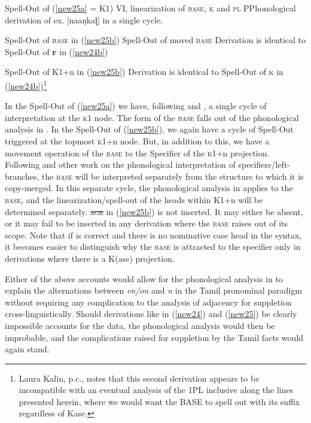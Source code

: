 \documentclass[output=paper]{langscibook}
\begin{document}
\begin{exe}
\ex
\begin{xlist}
\ex \label{new25c}
Spell-Out of (\ref{new25a} = K1)  \rightarrow 
\ea VI, linearization of \textsc{base}, \textsc{k} and \textsc{pl}
\ex PPhonological derivation of ex. [naaŋkaɭ]  in a single cycle.
\z



\ex \label{new25d} 
Spell-Out of \textsc{base} in (\ref{new25b}) \rightarrow 
\ea Spell-Out of moved \textsc{base} 	Derivation  is identical to Spell-Out 	of \textbf{\textsc{f}} in (\ref{new24b})
\z

Spell-Out of K1+n in (\ref{new25b})  \rightarrow 
\ea Derivation is identical to Spell-Out of  \textsc{k} in (\ref{new24b})\footnote{Laura Kalin, p.c., notes that this second derivation appears to be incompatible with an eventual analysis of the 1PL inclusive along the lines presented herein, where we would want the BASE to spell out with its suffix regardless of Kase.}\z
\end{xlist}
\end{exe}

In the Spell-Out of (\ref{new25a}) we have, following \citet{Moskal2015} and \citet{moskal2016towards}, a single cycle of interpretation at the \textsc{k}1 node. The form of the \textsc{base} falls out of the phonological analysis in . In the Spell-Out of (\ref{new25b}), we again have a cycle of Spell-Out triggered at the topmost \textsc{k}1+n node. But, in addition to this, we have a movement operation of the \textsc{base} to the Specifier of the \textsc{k}1+n projection. Following \citet{Johnson2004} and other work on the phonological interpretation of specifiers/left-branches, the \textsc{base} will be interpreted separately from the structure to which it is copy-merged. In this separate cycle, the phonological analysis in  applies to the \textsc{base}, and the linearization/spell-out of the heads within K1+n will be determined separately. \textsc{\sout{agr}} in (\ref{new25b}) is not inserted. It may either be absent, or it may fail to be inserted in any derivation where the \textsc{base} raises out of its scope. Note that if \citet{mcfadden2018aba} is correct and there is no nominative case head in the syntax, it becomes easier to distinguish why the \textsc{base} is attracted to the specifier only in derivations where there is a K(ase) projection.

Either of the above accounts would allow for the phonological analysis in  to explain the alternations between \textit{en/on} and \textit{n} in the Tamil pronominal paradigm without requiring any complication to the analysis of adjacency for suppletion cross-linguistically. Should derivations like in (\ref{new24}) and (\ref{new25}) be clearly impossible accounts for the data, the phonological analysis would then be improbable, and the complications raised for suppletion by the Tamil facts would again stand.
\end{document}
